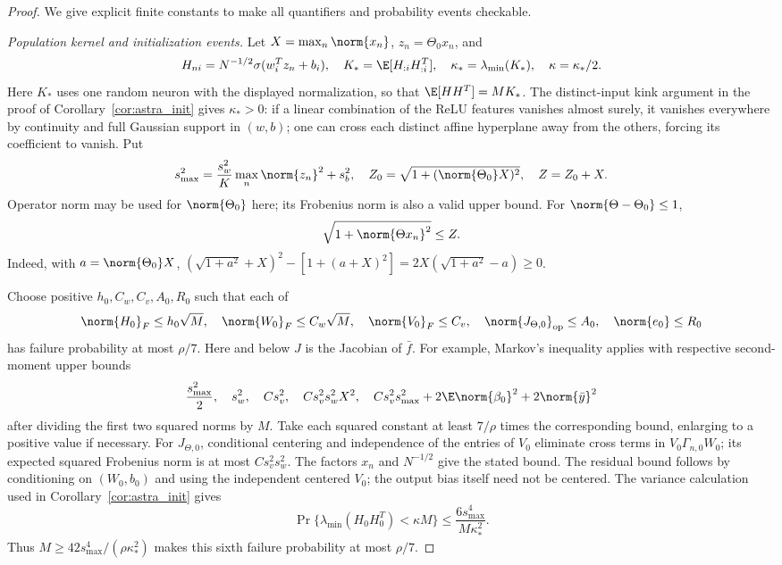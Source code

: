 \begin{proof}
We give explicit finite constants to make all quantifiers and
probability events checkable.

\emph{Population kernel and initialization events.}
Let $X=\max_n\norm{x_n}$, $z_n=\Theta_0x_n$, and
\[
 H_{ni}=N^{-1/2}\sigma(w_i^Tz_n+b_i),\quad
 K_* =\E[H_{:i}H_{:i}^T],\quad
 \kappa_* =\lambda_{\min}(K_*),\quad \kappa=\kappa_*/2.
\]
Here $K_*$ uses one random neuron with the displayed normalization,
so that $\E[HH^T]=MK_*$. The distinct-input kink argument in the proof
of Corollary~\ref{cor:astra_init} gives $\kappa_*>0$: if a linear
combination of the ReLU features vanishes almost surely, it vanishes
everywhere by continuity and full Gaussian support in $(w,b)$;
one can cross each distinct affine hyperplane away from the others,
forcing its coefficient to vanish.
Put
\[
 s_{\max}^2=\frac{s_w^2}{K}\max_n\norm{z_n}^2+s_b^2,
 \quad Z_0=\sqrt{1+(\norm{\Theta_0}X)^2},\quad Z=Z_0+X.
\]
Operator norm may be used for $\norm{\Theta_0}$ here; its Frobenius
norm is also a valid upper bound. For $\norm{\Theta-\Theta_0}\le1$,
\begin{equation}\label{eq:astra_zbound}
 \sqrt{1+\norm{\Theta x_n}^2}\le Z.
\end{equation}
Indeed, with $a=\norm{\Theta_0}X$,
$(\sqrt{1+a^2}+X)^2-[1+(a+X)^2]
=2X(\sqrt{1+a^2}-a)\ge0$.

Choose positive $h_0,C_w,C_v,A_0,R_0$ such that each of
\begin{equation}\label{eq:astra_fiveevents}
 \norm{H_0}_F\le h_0\sqrt M,\quad
 \norm{W_0}_F\le C_w\sqrt M,\quad
 \norm{V_0}_F\le C_v,\quad
 \norm{J_{\Theta,0}}_{\rm op}\le A_0,\quad
 \norm{e_0}\le R_0
\end{equation}
has failure probability at most $\rho/7$. Here and below $J$ is
the Jacobian of $\bar f$. For example, Markov's inequality applies
with respective second-moment upper bounds
\[
 \frac{s_{\max}^2}{2},\quad s_w^2,\quad Cs_v^2,\quad
 Cs_v^2s_w^2X^2,\quad
 Cs_v^2s_{\max}^2+2\E\norm{\beta_0}^2+2\norm{\bar y}^2
\]
after dividing the first two squared norms by $M$. Take each squared
constant at least $7/\rho$ times the corresponding bound, enlarging
to a positive value if necessary. For $J_{\Theta,0}$, conditional
centering and independence of the entries of $V_0$ eliminate cross
terms in $V_0\Gamma_{n,0}W_0$; its expected squared Frobenius norm
is at most $Cs_v^2s_w^2$. The factors $x_n$ and $N^{-1/2}$ give the
stated bound. The residual bound follows by conditioning on $(W_0,b_0)$
and using the independent centered $V_0$; the output bias itself need
not be centered.
The variance calculation used in Corollary~\ref{cor:astra_init} gives
\[
 \Pr\{\lambda_{\min}(H_0H_0^T)<\kappa M\}
 \le\frac{6s_{\max}^4}{M\kappa_*^2}.
\]
Thus $M\ge42s_{\max}^4/(\rho\kappa_*^2)$ makes this sixth failure
probability at most $\rho/7$.


\end{proof}
